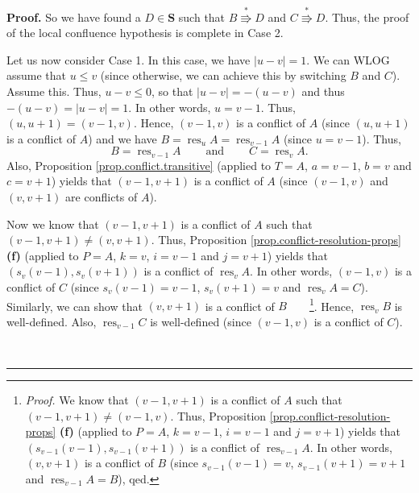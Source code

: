 \documentclass[numbers=enddot,12pt,final,onecolumn,notitlepage]{scrartcl}%
\theoremstyle{definition}
\newenvironment{proof}[1][Proof]{\noindent\textbf{#1.} }{\ \rule{0.5em}{0.5em}}
\newenvironment{verlong}{}{}
\begin{document}
\begin{verlong}
\begin{proof}
So we have found a $D\in\mathbf{S}$ such that $B\overset{\ast}{\Rrightarrow}D$
and $C\overset{\ast}{\Rrightarrow}D$. Thus, the proof of the local confluence
hypothesis is complete in Case 2.

Let us now consider Case 1. In this case, we have $\left\vert u-v\right\vert
=1$. We can WLOG assume that $u\leq v$ (since otherwise, we can achieve this
by switching $B$ and $C$). Assume this. Thus, $u-v\leq0$, so that $\left\vert
u-v\right\vert =-\left(  u-v\right)  $ and thus $-\left(  u-v\right)
=\left\vert u-v\right\vert =1$. In other words, $u=v-1$. Thus, $\left(
u,u+1\right)  =\left(  v-1,v\right)  $. Hence, $\left(  v-1,v\right)  $ is a
conflict of $A$ (since $\left(  u,u+1\right)  $ is a conflict of $A$) and we
have $B=\operatorname*{res}\nolimits_{u}A=\operatorname*{res}\nolimits_{v-1}A$
(since $u=v-1$). Thus,%
\[
B=\operatorname*{res}\nolimits_{v-1}A\ \ \ \ \ \ \ \ \ \ \text{and}%
\ \ \ \ \ \ \ \ \ \ C=\operatorname*{res}\nolimits_{v}A.
\]
Also, Proposition \ref{prop.conflict.transitive} (applied to $T=A$, $a=v-1$,
$b=v$ and $c=v+1$) yields that $\left(  v-1,v+1\right)  $ is a conflict of $A$
(since $\left(  v-1,v\right)  $ and $\left(  v,v+1\right)  $ are conflicts of
$A$).

Now we know that $\left(  v-1,v+1\right)  $ is a conflict of $A$ such that
$\left(  v-1,v+1\right)  \neq\left(  v,v+1\right)  $. Thus, Proposition
\ref{prop.conflict-resolution-props} \textbf{(f)} (applied to $P=A$, $k=v$,
$i=v-1$ and $j=v+1$) yields that $\left(  s_{v}\left(  v-1\right)
,s_{v}\left(  v+1\right)  \right)  $ is a conflict of $\operatorname*{res}%
\nolimits_{v}A$. In other words, $\left(  v-1,v\right)  $ is a conflict of $C$
(since $s_{v}\left(  v-1\right)  =v-1$, $s_{v}\left(  v+1\right)  =v$ and
$\operatorname*{res}\nolimits_{v}A=C$). Similarly, we can show that $\left(
v,v+1\right)  $ is a conflict of $B$\ \ \ \ \footnote{\textit{Proof.} We know
that $\left(  v-1,v+1\right)  $ is a conflict of $A$ such that $\left(
v-1,v+1\right)  \neq\left(  v-1,v\right)  $. Thus, Proposition
\ref{prop.conflict-resolution-props} \textbf{(f)} (applied to $P=A$, $k=v-1$,
$i=v-1$ and $j=v+1$) yields that $\left(  s_{v-1}\left(  v-1\right)
,s_{v-1}\left(  v+1\right)  \right)  $ is a conflict of $\operatorname*{res}%
\nolimits_{v-1}A$. In other words, $\left(  v,v+1\right)  $ is a conflict of
$B$ (since $s_{v-1}\left(  v-1\right)  =v$, $s_{v-1}\left(  v+1\right)  =v+1$
and $\operatorname*{res}\nolimits_{v-1}A=B$), qed.}. Hence,
$\operatorname*{res}\nolimits_{v}B$ is well-defined. Also,
$\operatorname*{res}\nolimits_{v-1}C$ is well-defined (since $\left(
v-1,v\right)  $ is a conflict of $C$).


\end{proof}
\end{verlong}
\end{document}

